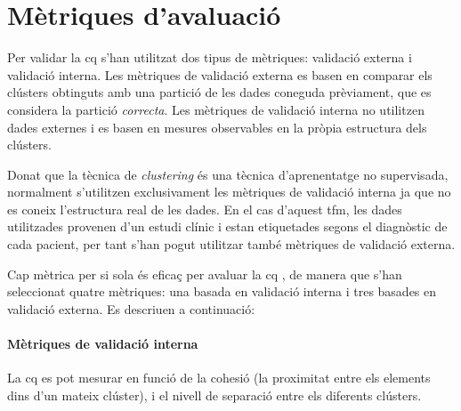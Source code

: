 \documentclass[CAT,BIB]{TFUOC}%
\begin{document}
    \section{Mètriques d'avaluació}
    \label{s:metrics}

        Per validar la \gls{cq}
        s'han utilitzat dos tipus de mètriques:
        validació externa i validació interna.
        Les mètriques de validació externa
        es basen en comparar els clústers obtinguts
        amb una partició de les dades coneguda prèviament,
        que es considera la partició \textit{correcta}.
        Les mètriques de validació interna
        no utilitzen dades externes i
        es basen en mesures observables
        en la pròpia estructura dels clústers.

        Donat que la tècnica de \textit{clustering}
        és una tècnica d'aprenentatge no supervisada,
        normalment s'utilitzen exclusivament les mètriques de validació interna
        ja que no es coneix l'estructura real de les dades.
        En el cas d'aquest \gls{tfm},
        les dades utilitzades provenen d'un estudi clínic
        i estan etiquetades segons el diagnòstic de cada pacient,
        per tant s'han pogut utilitzar també mètriques de validació externa.

        Cap mètrica per si sola és eficaç
        per avaluar la \gls{cq} \cite{Palacio-Nino2019},
        de manera que s'han seleccionat quatre mètriques:
        una basada en validació interna
        i tres basades en validació externa.
        Es descriuen a continuació:

        \paragraph{Mètriques de validació interna}
            La \gls{cq} es pot mesurar en funció de
            la cohesió
            (la proximitat entre els elements dins d'un mateix clúster),
            i el nivell de separació entre els diferents clústers.
\end{document}
